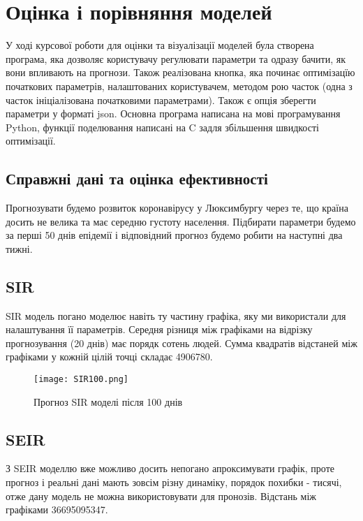 \chapter{Оцінка і порівняння моделей}


У ході курсової роботи для оцінки та візуалізації моделей була створена 
програма, яка дозволяє користувачу регулювати параметри та одразу бачити, 
як вони впливають на прогнози. Також реалізована кнопка, яка починає 
оптимізацїю початкових параметрів, налаштованих користувачем, методом рою 
часток (одна з часток ініціалізована початковими параметрами). Також 
є опція зберегти параметри у форматі json. 
Основна програма написана на мові програмування Python, функції поделювання 
написані на C задля збільшення швидкості оптимізації.


\section{Справжні дані та оцінка ефективності}

Прогнозувати будемо розвиток коронавірусу у Люксимбургу через те, що країна 
досить не велика та має середню густоту населення. 
Підбирати параметри будемо за перші 50 днів епідемії і відповідний прогноз 
будемо робити на наступні два тижні. 

\section{SIR}


SIR модель погано моделює навіть ту частину графіка, яку ми використали для 
налаштування її параметрів. Середня різниця між графіками на відрізку 
прогнозування (20 днів) має порядк сотень людей. 
Сумма квадратів відстаней між графіками у кожній цілій точці 
складає 4906780.


\begin{figure}[H]
    \centering
    \texttt{[image: SIR100.png]}
    \caption{Прогноз SIR моделі після 100 днів}
    \label{fig:plot1}
\end{figure}


\section{SEIR}


З SEIR моделлю вже можливо досить непогано апроксимувати графік, проте 
прогноз і реальні дані мають зовсім різну динаміку, порядок похибки - 
тисячі, отже дану модель не можна використовувати для пронозів. 
Відстань між графіками 36695095347.


